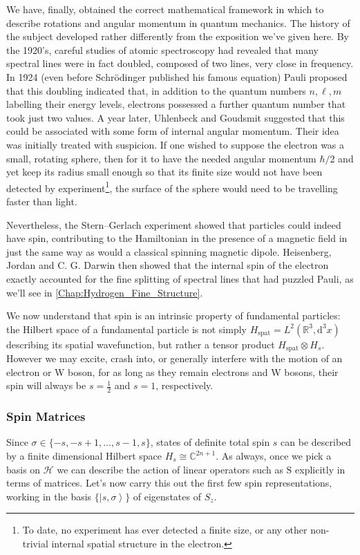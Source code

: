 \documentclass{article}
\theoremstyle{plain}\theoremheaderfont{\normalfont\itshape}\theorembodyfont{\rmfamily}\theoremseparator{.}\newtheorem*{rem}{Remark}\newtheorem*{ex}{Example}\newtheorem*{proof}{Proof}\newtheorem*{altp}{Alternative proof}
\theoremstyle{plain}\theoremheaderfont{\normalfont\bfseries}\theorembodyfont{\rmfamily}\theoremseparator{.}\newtheorem{thm}{Theorem}[section]\newtheorem{lem}[thm]{Lemma}\newtheorem{prop}[thm]{Proposition}\newtheorem*{cor}{Corollary}\newtheorem{defn}[thm]{Definition}\newtheorem{clm}[thm]{Claim}\newtheorem{clminproof}{Claim}
\theoremstyle{break}\theoremheaderfont{\normalfont\itshape}\theorembodyfont{\rmfamily}\theoremseparator{.\medskip}\newtheorem*{proofskip}{Proof}\newtheorem*{exs}{Examples}\newtheorem*{rems}{Remarks}
\theoremstyle{break}\theoremheaderfont{\normalfont\bfseries}\theorembodyfont{\rmfamily}\theoremseparator{.\medskip}\newtheorem{lemskip}[thm]{Lemma}\newtheorem{defnskip}[thm]{Definition}\newtheorem{propskip}[thm]{Proposition}\newtheorem{thmskip}[thm]{Theorem}
\numberwithin{equation}{section}
\renewcommand{\d}[2][]{\mathrm{d}^{#1} #2}
\newcommand{\ket}[1]{\left| #1 \right\rangle}
\newcommand{\vb}[1]{\bm{\mathrm{#1}}}
\newcommand{\hb}{\mathcal{H}}
\newcommand{\RR}{\mathbb{R}}
\newcommand{\CC}{\mathbb{C}}
\begin{document}
    We have, finally, obtained the correct mathematical framework in which to describe rotations and angular momentum in quantum mechanics. The history of the subject developed rather differently from the exposition we've given here. By the 1920's, careful studies of atomic spectroscopy had revealed that many spectral lines were in fact doubled, composed of two lines, very close in frequency. In 1924 (even before Schr\"{o}dinger published his famous equation) Pauli proposed that this doubling indicated that, in addition to the quantum numbers \(n,\ell,m\) labelling their energy levels, electrons possessed a further quantum number that took just two values. A year later, Uhlenbeck and Goudsmit suggested that this could be associated with some form of internal angular momentum. Their idea was initially treated with suspicion. If one wished to suppose the electron was a small, rotating sphere, then for it to have the needed angular momentum \(\hbar/2\) and yet keep its radius small enough so that its finite size would not have been detected by experiment\footnote{To date, no experiment has ever detected a finite size, or any other non-trivial internal spatial structure in the electron.}, the surface of the sphere would need to be travelling faster than light.

    Nevertheless, the Stern--Gerlach experiment showed that particles could indeed have spin, contributing to the Hamiltonian in the presence of a magnetic field in just the same way as would a classical spinning magnetic dipole. Heisenberg, Jordan and C. G. Darwin then showed that the internal spin of the electron exactly accounted for the fine splitting of spectral lines that had puzzled Pauli, as we'll see in \cref{Chap:Hydrogen_Fine_Structure}.

    We now understand that spin is an intrinsic property of fundamental particles: the Hilbert space of a fundamental particle is not simply \(H_{\text{spat}}=L^2(\RR^3,\d[3]{x})\) describing its spatial wavefunction, but rather a tensor product \(H_{\text{spat}}\otimes H_s\). However we may excite, crash into, or generally interfere with the motion of an electron or W boson, for as long as they remain electrons and W bosons, their spin will always be \(s=\frac{1}{2}\) and \(s=1\), respectively.

    \subsubsection{Spin Matrices}
    Since \(\sigma\in\{-s,-s+1,\dots,s-1,s\}\), states of definite total spin \(s\) can be described by a finite dimensional Hilbert space \(H_s\cong\CC^{2n+1}\). As always, once we pick a basis on \(\hb\) we can describe the action of linear operators such as \(\vb{S}\) explicitly in terms of matrices. Let's now carry this out the first few spin representations, working in the basis \(\{\ket{s,\sigma}\}\) of eigenstates of \(S_z\).
\end{document}
